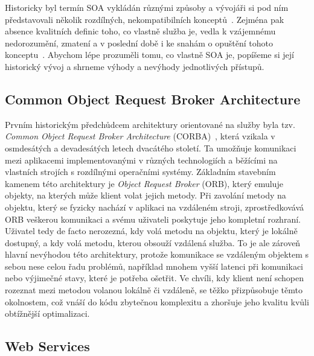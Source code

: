 Historicky byl termín SOA vykládán různými způsoby a vývojáři si
pod ním představovali několik rozdílných, nekompatibilních
konceptů~\cite{fowler2005serviceorientedambiguity}.
Zejména pak absence kvalitních definic toho, co vlastně
služba je, vedla k vzájemnému nedorozumění, zmatení a v poslední
době i ke snahám o opuštění tohoto konceptu~\cite{cerny2017disambiguation}.
Abychom lépe prozuměli tomu, co vlastně SOA je, popíšeme si její historický
vývoj a shrneme výhody a nevýhody jednotlivých přístupů.

\subsection{Common Object Request Broker Architecture}

Prvním historickým předchůdcem architektury orientované na služby
byla tzv. \textit{Common Object Request Broker Architecture}
(CORBA)~\cite{siegel2000corba}, která vzikala v osmdesátých a devadesátých letech
dvacátého století. Ta umožňuje komunikaci mezi aplikacemi implementovanými v
různých technologiích a běžícími na vlastních strojích s rozdílnými
operačními systémy. Základním stavebním kamenem této architektury
je \textit{Object Request Broker} (ORB), který emuluje objekty,
na kterých může klient volat jejich metody. Při zavolání metody
na objektu, který se fyzicky nachází v aplikaci na vzdáleném stroji,
zprostředkovává ORB veškerou komunikaci a svému uživateli poskytuje
jeho kompletní rozhraní. Uživatel tedy de facto nerozezná, kdy volá
metodu na objektu, který je lokálně dostupný,
a kdy volá metodu, kterou obsouží vzdálená služba. To je ale zároveň
hlavní nevýhodou této architektury, protože komunikace se vzdáleným
objektem s sebou nese celou řadu problémů, například mnohem vyšší latenci
při komunikaci nebo výjimečné stavy, které je potřeba ošetřit. Ve chvíli,
kdy klient není schopen rozeznat mezi metodou volanou lokálně či vzdáleně,
se těžko přizpůsobuje těmto okolnostem, což vnáší do kódu zbytečnou
komplexitu a zhoršuje jeho kvalitu kvůli obtížnější optimalizaci.

\subsection{Web Services}

